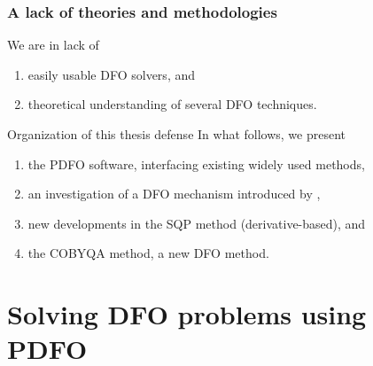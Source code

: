 \documentclass{polyu-presentation}
\begin{document}
\begin{frame}
    \frametitle{A lack of theories and methodologies}

    We are in lack of
    \begin{enumerate}
        \item easily usable DFO \alert{solvers}, and
        \item \alert{theoretical} understanding of several DFO techniques.
    \end{enumerate}

    \bigskip

    \begin{block}{Organization of this thesis defense}
        In what follows, we present
        \begin{enumerate}
            \item the \alert{PDFO} software, interfacing existing widely used methods,
            \item an investigation of a \alert{DFO mechanism} introduced by \textcite{Powell_2006},
            \item new developments in the \alert{SQP method} (derivative-based), and
            \item the \alert{COBYQA} method, a new DFO method.
        \end{enumerate}
    \end{block}
\end{frame}

\section{Solving DFO problems using PDFO}
\end{document}
